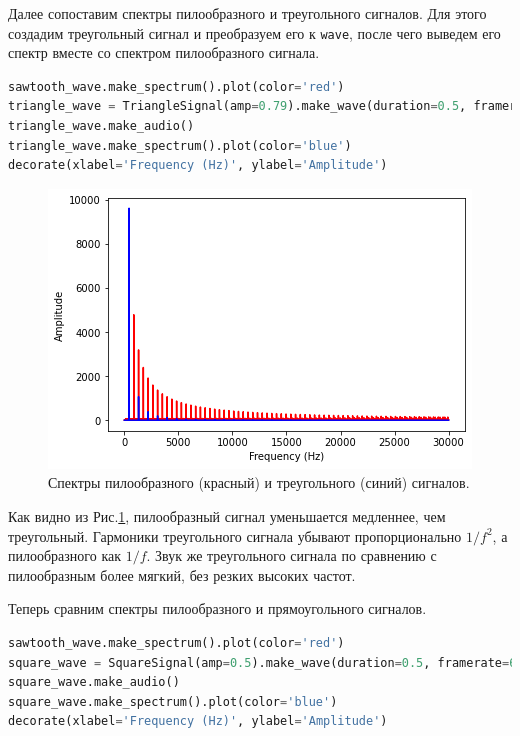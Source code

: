\documentclass[a4paper, 14pt]{extarticle}
\begin{document}
    Далее сопоставим спектры пилообразного и треугольного сигналов.
    Для этого создадим треугольный сигнал и преобразуем его к \texttt{wave}, после чего выведем его спектр вместе со спектром пилообразного сигнала.

    \begin{lstlisting}[language=Python, caption= Вывод спектров треугольного и пилообразного сигналов., label={lst:task2_spectrum_sawtooth_triangle}]
sawtooth_wave.make_spectrum().plot(color='red')
triangle_wave = TriangleSignal(amp=0.79).make_wave(duration=0.5, framerate=60000)
triangle_wave.make_audio()
triangle_wave.make_spectrum().plot(color='blue')
decorate(xlabel='Frequency (Hz)', ylabel='Amplitude')
    \end{lstlisting}

    \begin{figure}[h]
        \centering
        \includegraphics[width=0.8\linewidth]{resources/Images/task2_spectrum_sawtooth_triangle}
        \caption{Спектры пилообразного (красный) и треугольного (синий) сигналов.}
        \label{fig:task2_spectrum_sawtooth_triangle}
    \end{figure}

    Как видно из Рис.\ref{fig:task2_spectrum_sawtooth_triangle}, пилообразный сигнал уменьшается медленнее, чем треугольный.
    Гармоники треугольного сигнала убывают пропорционально $1/f^2$, а пилообразного как $1/f$.
    Звук же треугольного сигнала по сравнению с пилообразным более мягкий, без резких высоких частот.

    Теперь сравним спектры пилообразного и прямоугольного сигналов.

    \begin{lstlisting}[language=Python, caption= Вывод спектров прямоугольного и пилообразного сигналов., label={lst:task2_spectrum_sawtooth_square}]
sawtooth_wave.make_spectrum().plot(color='red')
square_wave = SquareSignal(amp=0.5).make_wave(duration=0.5, framerate=60000)
square_wave.make_audio()
square_wave.make_spectrum().plot(color='blue')
decorate(xlabel='Frequency (Hz)', ylabel='Amplitude')
    \end{lstlisting}
\end{document}
